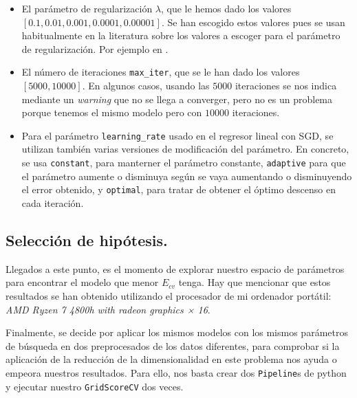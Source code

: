 \documentclass[a4paper, 20pt]{article}
\begin{document}
\begin{itemize}
\item El parámetro de regularización $\lambda$, que le hemos dado los valores $[0.1,0.01,0.001,0.0001,0.00001]$. Se han escogido estos valores pues se usan habitualmente en la literatura sobre los valores a escoger para el parámetro de regularización. Por ejemplo en \cite{2013applied}.

\item El número de iteraciones \lstinline{max_iter}, que se le han dado los valores $[5000,10000]$. En algunos casos, usando las $5000$ iteraciones se nos indica mediante un \emph{warning} que no se llega a converger, pero no es un problema porque tenemos el mismo modelo pero con $10000$ iteraciones.

  \item Para el parámetro \lstinline{learning_rate} usado en el regresor lineal con SGD, se utilizan también varias versiones de modificación del parámetro. En concreto, se usa \lstinline{constant}, para manterner el parámetro constante, \lstinline{adaptive} para que el parámetro aumente o disminuya según se vaya aumentando o disminuyendo el error obtenido, y \lstinline{optimal}, para tratar de obtener el óptimo descenso en cada iteración.

\end{itemize}


\subsection{Selección de hipótesis.}

Llegados a este punto, es el momento de explorar nuestro espacio de parámetros para encontrar el modelo que menor $E_{cv}$  tenga. Hay que mencionar que estos resultados se han obtenido utilizando el procesador de mi ordenador portátil: \emph{AMD Ryzen 7 4800h with radeon graphics × 16}.

Finalmente, se decide por aplicar los mismos modelos con los mismos parámetros de búsqueda en dos preprocesados de los datos diferentes, para comprobar si la aplicación de la reducción de la dimensionalidad en este problema nos ayuda o empeora nuestros resultados. Para ello, nos basta crear dos \lstinline{Pipeline}s de python y ejecutar nuestro \lstinline{GridScoreCV} dos veces.
\end{document}
